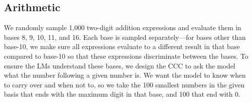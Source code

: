 \subsection{Arithmetic}

We randomly sample 1,000 two-digit addition expressions and evaluate them in bases 8, 9, 10, 11, and 16. Each base is sampled separately---for bases other than base-10, we make sure all expressions evaluate to a different result in that base compared to base-10 so that these expressions discriminate between the bases.
To ensure the LMs understand these bases, we design the CCC to ask the model what the number following a given number is. We want the model to know when to carry over and when not to, so we take the 100 smallest numbers in the given basis that ends with the maximum digit in that base, and 100 that end with 0.
